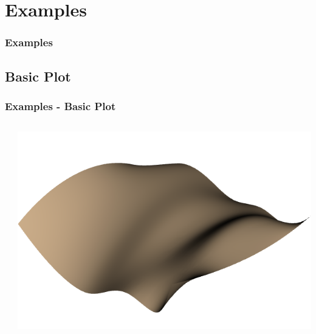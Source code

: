 \documentclass[t]{beamer}
\begin{document}
\section{Examples}

\begin{frame}
  \frametitle{Examples}
  \tableofcontents[currentsection]
  \vspace{200pt}  %
\end{frame}

\subsection{Basic Plot}
\begin{frame}
  \frametitle{Examples - Basic Plot}

  \begin{center}
    \begin{columns}[T]
      \begin{column}{.5\textwidth}
        \inputminted[fontsize=\footnotesize]{python}{code/basic_usage.py}
      \end{column}

      \begin{column}{.5\textwidth}
        \centering
        \includegraphics[width=1.0\textwidth]{figures/basic_usage.png}
      \end{column}
    \end{columns}
  \end{center}

\end{frame}


\end{document}
